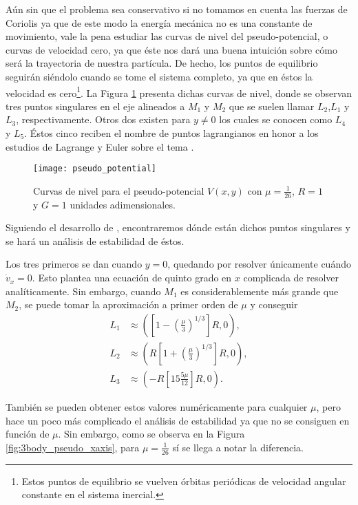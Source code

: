 Aún sin que el problema sea conservativo si no tomamos en cuenta las fuerzas de Coriolis ya que de este modo la energía mecánica no es una constante de movimiento, vale la pena estudiar las curvas de nivel del pseudo-potencial, o curvas de velocidad cero, ya que éste nos dará una buena intuición sobre cómo será la trayectoria de nuestra partícula. De hecho, los puntos de equilibrio seguirán siéndolo cuando se tome el sistema completo, ya que en éstos la velocidad es cero\footnote{Estos puntos de equilibrio se vuelven órbitas periódicas de velocidad angular constante en el sistema inercial.}. La Figura \ref{fig:3body_pseudo_potential} presenta dichas curvas de nivel, donde se observan tres puntos singulares en el eje alineados a $M_1$ y $M_2$ que se suelen llamar $L_2$,$L_1$ y $L_3$, respectivamente. Otros dos existen para $y \neq 0$ los cuales se conocen como $L_4$ y $L_5$. Éstos cinco reciben el nombre de puntos lagrangianos en honor a los estudios de Lagrange y Euler sobre el tema \cite{Lagrange1867 , Euler1736}.

\begin{figure}[h!]
 \centering
 \texttt{[image: pseudo\_potential]}
 \caption{Curvas de nivel para el pseudo-potencial $V(x,y)$ con $\mu = \frac{1}{26}$, $R=1$ y $G=1$ unidades adimensionales.}
 \label{fig:3body_pseudo_potential}
\end{figure}

Siguiendo el desarrollo de \cite{Cornish1998, Widnall2008}, encontraremos dónde están dichos puntos singulares y se hará un análisis de estabilidad de éstos.

Los tres primeros se dan cuando $y=0$, quedando por resolver únicamente cuándo $\dot{v}_x = 0$. Esto plantea una ecuación de quinto grado en $x$ complicada de resolver analíticamente. Sin embargo, cuando $M_1$ es considerablemente más grande que $M_2$, se puede tomar la aproximación a primer orden de $\mu$ y conseguir
\begin{align}
 L_1 &\approx \left( \left[ 1 - \left(\frac{\mu}{3}\right)^{1/3} \right] R , 0 \right) \nonumber, \\ 
 L_2 &\approx \left( R\left[ 1 + \left(\frac{\mu}{3}\right)^{1/3} \right] R , 0 \right) \nonumber, \\
 L_3 &\approx \left( -R\left[ 1 5 \frac{5 \mu}{12} \right] R, 0 \right).
 \label{eq:3body_L123}
\end{align} 

También se pueden obtener estos valores numéricamente para cualquier $\mu$, pero hace un poco más complicado el análisis de estabilidad ya que no se consiguen en función de $\mu$. Sin embargo, como se observa en la Figura \ref{fig:3body_pseudo_xaxis}, para $\mu = \frac{1}{26}$ sí se llega a notar la diferencia.

